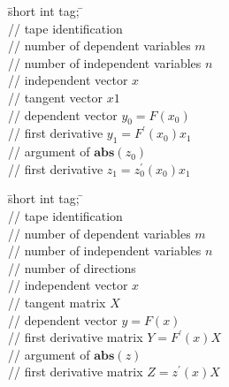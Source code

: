 \begin{tabbing}
\hspace{0.5in}\={\sf short int tag;} \hspace{1.1in}\= \kill    %
\\
         \> // tape identification \\
                 \> // number of dependent variables $m$\\
                 \> // number of independent variables $n$\\
          \> // independent vector $x$ \\
          \> // tangent vector $x1$\\
          \> // dependent vector $y_0=F(x_0)$ \\
          \> // first derivative $y_1=F^\prime (x_0)x_1$\\
          \> // argument of $\mathbf{abs}(z_0)$ \\
          \> // first derivative $z_1=z_0^\prime (x_0)x_1$
\end{tabbing}

\begin{tabbing}
\hspace{0.5in}\={\sf short int tag;} \hspace{1.1in}\= \kill    %
\\
         \> // tape identification \\
                 \> // number of dependent variables $m$\\
                 \> // number of independent variables $n$\\
                 \> // number of directions\\
           \> // independent vector $x$ \\
        \> // tangent matrix $X$\\
           \> // dependent vector $y=F(x)$ \\
        \> // first derivative matrix $Y=F^\prime (x)X$\\
           \> // argument of $\mathbf{abs}(z)$ \\
        \> // first derivative matrix $Z=z^\prime (x)X$
\end{tabbing}

